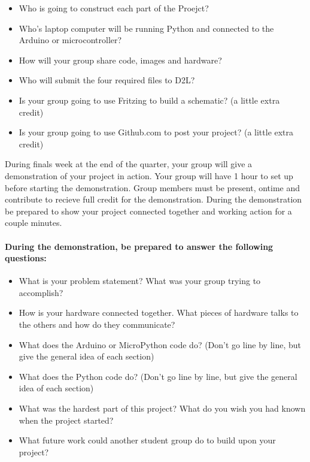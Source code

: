 \documentclass[11pt]{article}
\providecommand{\tightlist}{%
      \setlength{\itemsep}{0pt}\setlength{\parskip}{0pt}}
\begin{document}
\begin{itemize}
\tightlist
\item
  Who is going to construct each part of the Proejct?
\item
  Who's laptop computer will be running Python and connected to the
  Arduino or microcontroller?
\item
  How will your group share code, images and hardware?
\item
  Who will submit the four required files to D2L?
\item
  Is your group going to use Fritzing to build a schematic? (a little
  extra credit)
\item
  Is your group going to use Github.com to post your project? (a little
  extra credit)
\end{itemize}

    During finals week at the end of the quarter, your group will give a
demonstration of your project in action. Your group will have 1 hour to
set up before starting the demonstration. Group members must be present,
ontime and contribute to recieve full credit for the demonstration.
During the demonstration be prepared to show your project connected
together and working action for a couple minutes.

\hypertarget{during-the-demonstration-be-prepared-to-answer-the-following-questions}{%
\paragraph{During the demonstration, be prepared to answer the following
questions:}\label{during-the-demonstration-be-prepared-to-answer-the-following-questions}}

\begin{itemize}
\tightlist
\item
  What is your problem statement? What was your group trying to
  accomplish?
\item
  How is your hardware connected together. What pieces of hardware talks
  to the others and how do they communicate?
\item
  What does the Arduino or MicroPython code do? (Don't go line by line,
  but give the general idea of each section)
\item
  What does the Python code do? (Don't go line by line, but give the
  general idea of each section)
\item
  What was the hardest part of this project? What do you wish you had
  known when the project started?
\item
  What future work could another student group do to build upon your
  project?
\end{itemize}
\end{document}
